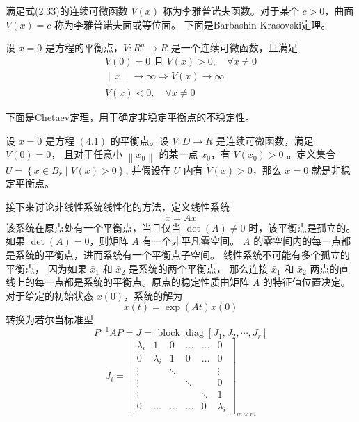 满足式(2.33)的连续可微函数 $V(x)$ 称为李雅普诺夫函数。对于某个 $c>0$，曲面 $V(x)=c$ 称为李雅普诺夫面或等位面。
下面是Barbashin-Krasovski定理。 
\begin{theorem}
    设 $x=0$ 是方程的平衡点，$V: R^n \rightarrow R$ 是一个连续可微函数，且满足
    \begin{equation}
        \begin{gathered}
        V(0)=0 \text { 且 } V(x)>0,\quad \forall x \neq 0 \\
        \|x\| \rightarrow \infty \Rightarrow V(x) \rightarrow \infty \\
        \dot{V}(x)<0,\quad \forall x \neq 0
        \end{gathered}
     \end{equation}
\end{theorem}
下面是Chetaev定理，用于确定非稳定平衡点的不稳定性。
\begin{theorem}
    设 $x=0$ 是方程 $(4.1)$ 的平衡点。设 $V: D \rightarrow R$ 是连续可微函数，满足 $V(0)=0$，
    且对于任意小 $\left\|x_0\right\|$ 的某一点 $x_0$，有 $V\left(x_0\right)>0$ 。定义集合 $U=\left\{x \in B_r \mid V(x)>0\right\}$,
    并假设在 $U$ 内有 $\dot{V}(x)>0$，那么 $x=0$ 就是非稳定平衡点。
\end{theorem}
接下来讨论非线性系统线性化的方法，定义线性系统
\begin{equation}
    \dot{x}=A x
\end{equation}
该系统在原点处有一个平衡点，当且仅当 $\operatorname{det}(A) \neq 0$ 时，该平衡点是孤立的。
如果 $\operatorname{det}(A)=0$，则矩阵 $A$ 有一个非平凡零空间。 $A$ 的零空间内的每一点都是系统的平衡点，进而系统有一个平衡点子空间。
线性系统不可能有多个孤立的平衡点， 因为如果 $\bar{x}_1$ 和 $\bar{x}_2$ 是系统的两个平衡点， 那么连接 $\bar{x}_1$ 和 $\bar{x}_2$ 
两点的直线上的每一点都是系统的平衡点。原点的稳定性质由矩阵 $A$ 的特征值位置决定。对于给定的初始状态 $x(0)$，系统的解为
\begin{equation}
    x(t)=\exp (A t) x(0)
\end{equation}
转换为若尔当标准型
\begin{equation}
    P^{-1} A P=J=\text { block } \operatorname{diag}\left[J_1,J_2,\cdots,J_r\right]
\end{equation}
\begin{equation}
    J_i=\left[\begin{array}{cccccc}
    \lambda_i & 1 & 0 & \ldots & \ldots & 0 \\
    0 & \lambda_i & 1 & 0 & \ldots & 0 \\
    \vdots & & \ddots & & & \vdots \\
    \vdots & & & \ddots & & 0 \\
    \vdots & & & & \ddots & 1 \\
    0 & \ldots & \ldots & \ldots & 0 & \lambda_i
    \end{array}\right]_{m \times m}
\end{equation}
